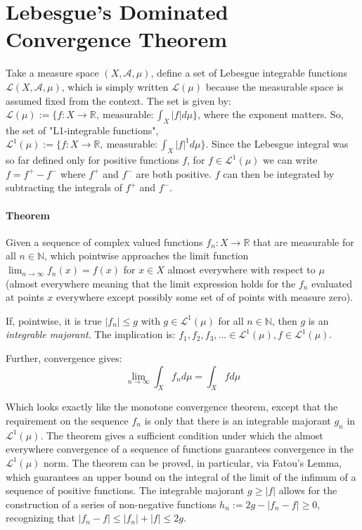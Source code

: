 \section{Lebesgue's Dominated Convergence Theorem}

Take a measure space $(X,\mathscr{A},\mu)$, define a set of Lebesgue integrable functions $\mathscr{L}(X,\mathscr{A},\mu)$, which is simply written $\mathscr{L}(\mu)$ because the measurable space is assumed fixed from the context. The set is given by: $\mathscr{L}(\mu) := \{f: X\rightarrow \mathbb{R}, \mathrm{\ measurable}: \int_X |f| d\mu \}$, where the exponent matters. So, the set of "L1-integrable functions", $\mathscr{L}^1(\mu) := \{f: X\rightarrow \mathbb{R}, \mathrm{\ measurable}: \int_X |f|^1 d\mu \}$. Since the Lebesgue integral was so far defined only for positive functions $f$, for $f\in\mathscr{L^1}(\mu)$ we can write $f=f^+ - f^-$ where $f^+$ and $f^-$ are both positive. $f$ can then be integrated by subtracting the integrals of $f^+$ and $f^-$.

\paragraph{Theorem} 
Given a sequence of complex valued functions $f_n: X \rightarrow \mathbb{R}$ that are measurable for all $n\in\mathbb{N}$, which pointwise approaches the limit function $\lim_{n\rightarrow \infty} f_n(x) = f(x)$ for $x\in X$ almost everywhere with respect to $\mu$ (almost everywhere meaning that the limit expression holds for the $f_n$ evaluated at points $x$ everywhere except possibly some set of of points with measure zero). 

If, pointwise, it is true $|f_n| \leq g$ with $g\in \mathscr{L}^{1}(\mu)$ for all $n\in \mathbb{N}$, then $g$ is an \textit{integrable majorant}. The implication is: $f_1, f_2, f_3, ... \in \mathscr{L}^{1}(\mu), f\in\mathscr{L}^1(\mu)$. 

Further, convergence gives:
\begin{equation}
\lim_{n\rightarrow \infty}\int_X f_n d \mu = \int_X f d\mu
\end{equation}   

Which looks exactly like the monotone convergence theorem, except that the requirement on the sequence $f_n$ is only that there is an integrable majorant $g_n$ in $\mathscr{L}^1(\mu)$. The theorem gives a sufficient condition under which the almost everywhere convergence of a sequence of functions guarantees convergence in the $\mathscr{L}^1(\mu)$ norm. The theorem can be proved, in particular, via Fatou's Lemma, which guarantees an upper bound on the integral of the limit of the infimum of a sequence of positive functions. The integrable majorant $g\geq |f|$ allows for the construction of a series of non-negative functions $h_n := 2g - |f_n - f| \geq 0$, recognizing that $|f_n - f| \leq |f_n| + |f| \leq 2g$. 

